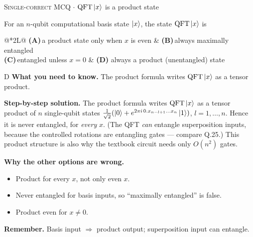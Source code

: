 \documentclass[11pt,a4paper]{article}
\newcommand{\optlabel}[1]{\textbf{(#1)}}
\newcommand{\correctlabel}[1]{\textcolor{okgreen}{\textbf{(#1)}\,\ding{51}}}
\newenvironment{qitem}[1]{\begin{list}{}{\setlength{\leftmargin}{3.3em}\setlength{\labelwidth}{3.1em}%
  \setlength{\labelsep}{0.2em}\setlength{\topsep}{3pt}\setlength{\parsep}{3pt}}\item[\textbf{Q.#1}\hfill]}{\end{list}}
\newcommand{\qsep}{\par\vspace{2pt}{\color{black!15}\hrule}\vspace{4pt}}
\newcommand{\qmeta}[2]{{\footnotesize\color{black!60}\textsc{#1} \;$\cdot$\; #2}\par}
\newcommand{\QFTop}{\mathrm{QFT}}
\begin{document}
\begin{qitem}{54}
\qmeta{Single-correct MCQ}{$\mathrm{QFT}\ket{x}$ is a product state}
For an $n$-qubit computational basis state $\ket x$, the state $\mathrm{QFT}\ket x$ is
\par\smallskip\noindent\begin{tabularx}{\linewidth}{@{}*{2}{L}@{}}
\optlabel{A}\,a product state only when $x$ is even & \optlabel{B}\,always maximally entangled \\[3pt]
\optlabel{C}\,entangled unless $x = 0$ & \correctlabel{D}\,always a product (unentangled) state
\end{tabularx}
\end{qitem}
\begin{solbox}{D}
\textbf{\color{brand}What you need to know.} The product formula writes $\QFTop\ket x$ as a tensor product.

\textbf{\color{brand}Step-by-step solution.} The product formula writes $\mathrm{QFT}\ket{x}$ as a tensor product of $n$ single-qubit states
$\frac{1}{\sqrt2}(\ket0 + e^{2\pi i\,0.x_{n-l+1}\dots x_n}\ket1)$, $l = 1, \dots, n$. Hence it is never entangled,
for \emph{every} $x$. (The QFT \emph{can} entangle superposition inputs, because the controlled rotations are entangling
gates --- compare Q.25.) This product structure is also why the textbook circuit needs only $O(n^2)$ gates.

\textbf{\color{brand}Why the other options are wrong.}
\begin{itemize}[leftmargin=2.4em, itemsep=1pt, topsep=2pt]
\item[\textbf{(A)}] Product for every $x$, not only even $x$.
\item[\textbf{(B)}] Never entangled for basis inputs, so ``maximally entangled'' is false.
\item[\textbf{(C)}] Product even for $x \neq 0$.
\end{itemize}
\textbf{\color{brand}Remember.} Basis input $\Rightarrow$ product output; superposition input can entangle.
\end{solbox}
\qsep
\end{document}
